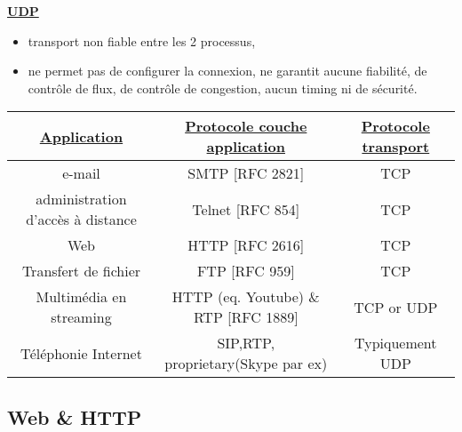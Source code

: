 \documentclass{article}
\begin{document}
\underline{\textbf{UDP}}
\begin{itemize}
\item transport non fiable entre les 2 processus,
\item ne permet pas de configurer la connexion, ne garantit aucune fiabilité, de contrôle de flux, de contrôle
de congestion, aucun timing ni de sécurité.
\end{itemize}

\begin{center}
	\begin{tabular}{|*{3}{c|}}
		\hline
		\textbf{\underline{Application}} & \textbf{\underline{Protocole couche application}} & 	
		\textbf{\underline{Protocole transport}} \\
		\hline
		e-mail & SMTP [RFC 2821] & TCP \\
		\hline
		administration d'accès à distance & Telnet [RFC 854] & TCP \\
		\hline
		Web & HTTP [RFC 2616] & TCP \\
		\hline
		Transfert de fichier & FTP [RFC 959] & TCP \\
		\hline
		Multimédia en streaming & HTTP (eq. Youtube) \& RTP [RFC 1889] & TCP or UDP \\
		\hline
		Téléphonie Internet & SIP,RTP, proprietary(Skype par ex) & Typiquement UDP  \\		
		\hline
	\end{tabular}
\end{center}

\newpage

\subsection{Web \& HTTP}
\end{document}
